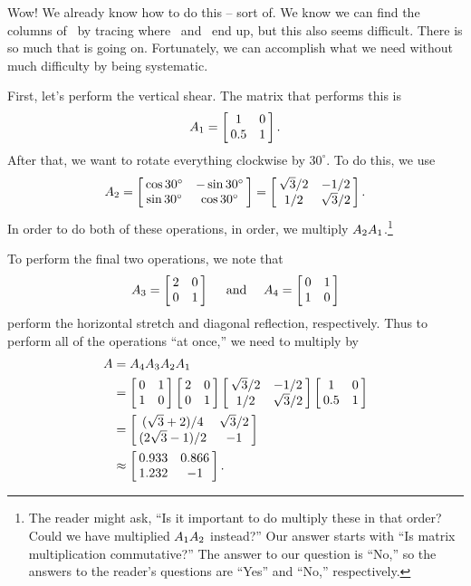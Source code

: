 {Wow! We already know how to do this -- sort of. We know we can find the columns of \tta\ by tracing where \veone\ and \vetwo\ end up, but this also seems difficult. There is so much that is going on. Fortunately, we can accomplish what we need without much difficulty by being systematic.

First, let's perform the vertical shear. The matrix that performs this is $$\tta_1 = \bmx{cc}1&0\\0.5&1\emx.$$ After that, we want to rotate everything clockwise by $30^\circ$. To do this, we use $$\tta_2 = \bmx{cc} \cos 30^\circ & -\sin 30^\circ\\ \sin 30^\circ & \cos 30^\circ \emx = \bmx{cc} \sqrt{3}/2 & -1/2 \\ 1/2 & \sqrt{3}/2\emx.$$ In order to do both of these operations, in order, we multiply $\tta_2\tta_1$.\footnote{The reader might ask, ``Is it important to do multiply these in that order? Could we have multiplied $\tta_1\tta_2$ instead?'' Our answer starts with ``Is matrix multiplication commutative?'' The answer to our question is ``No,'' so the answers to the reader's questions are ``Yes'' and ``No,'' respectively.} 


To perform the final two operations, we note that $$\tta_3 = \bmx{cc}2&0\\0&1\emx \quad \text{ and } \quad \tta_4 = \bmx{cc} 0&1 \\ 1&0\emx$$ perform the horizontal stretch and diagonal reflection, respectively. Thus to perform all of the operations ``at once,'' we need to multiply by 
\begin{align*} \tta &= \tta_4\tta_3\tta_2\tta_1 \\
										& = \bmx{cc} 0&1 \\ 1&0\emx\bmx{cc}2&0\\0&1\emx\bmx{cc} \sqrt{3}/2 & -1/2 \\ 1/2 & \sqrt{3}/2\emx\bmx{cc}1&0\\0.5&1\emx \\
										& = \bmx{cc} (\sqrt{3}+2)/4 & \sqrt{3}/2 \\ (2\sqrt{3}-1)/2 & -1\emx\\
										& \approx \bmx{cc} 0.933 & 0.866\\ 1.232 & -1 \emx.
\end{align*}

}
